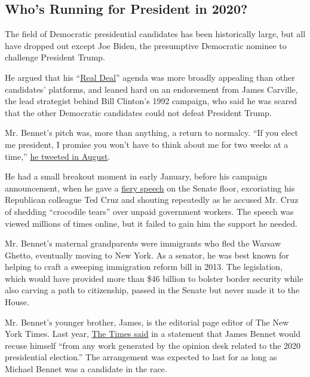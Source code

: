 \hypertarget{whos-running-for-president-in-2020}{%
\subsection{Who's Running for President in
2020?}\label{whos-running-for-president-in-2020}}

The field of Democratic presidential candidates has been historically
large, but all have dropped out except Joe Biden, the presumptive
Democratic nominee to challenge President Trump.

He argued that his ``\href{https://michaelbennet.com/RealDeal/}{Real
Deal}'' agenda was more broadly appealing than other candidates'
platforms, and leaned hard on an endorsement from James Carville, the
lead strategist behind Bill Clinton's 1992 campaign, who said he was
scared that the other Democratic candidates could not defeat President
Trump.

Mr. Bennet's pitch was, more than anything, a return to normalcy. ``If
you elect me president, I promise you won't have to think about me for
two weeks at a time,''
\href{https://twitter.com/MichaelBennet/status/1158806845953323008?s=20}{he
tweeted in August}.

He had a small breakout moment in early January, before his campaign
announcement, when he gave a
\href{https://www.youtube.com/watch?v=78dsjOIE5L8\&feature=youtu.be}{fiery
speech} on the Senate floor, excoriating his Republican colleague Ted
Cruz and shouting repeatedly as he accused Mr. Cruz of shedding
``crocodile tears'' over unpaid government workers. The speech was
viewed millions of times online, but it failed to gain him the support
he needed.

Mr. Bennet's maternal grandparents were immigrants who fled the Warsaw
Ghetto, eventually moving to New York. As a senator, he was best known
for helping to craft a sweeping immigration reform bill in 2013. The
legislation, which would have provided more than \$46 billion to bolster
border security while also carving a path to citizenship, passed in the
Senate but never made it to the House.

Mr. Bennet's younger brother, James, is the editorial page editor of The
New York Times. Last year,
\href{https://www.nytimes.com/2019/05/02/business/media/james-michael-bennet-new-york-times.html}{The
Times said} in a statement that James Bennet would recuse himself ``from
any work generated by the opinion desk related to the 2020 presidential
election.'' The arrangement was expected to last for as long as Michael
Bennet was a candidate in the race.


